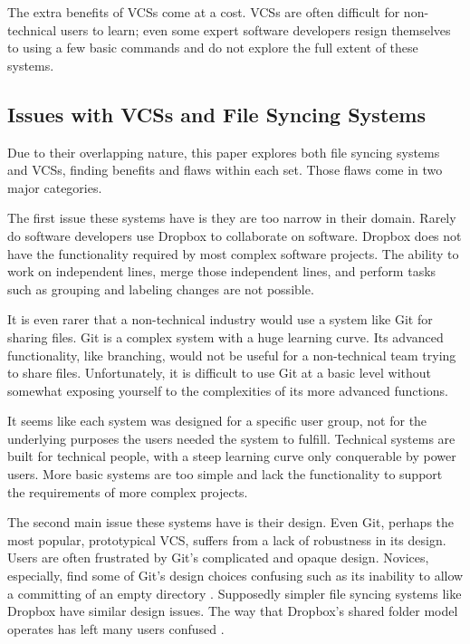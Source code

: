 The extra benefits of VCSs come at a cost. VCSs are often difficult for non-technical users to learn; even some expert software developers resign themselves to using a few basic commands and do not explore the full extent of these systems. 

\subsection{Issues with VCSs and File Syncing Systems}

Due to their overlapping nature, this paper explores both file syncing systems and VCSs, finding benefits and flaws within each set. Those flaws come in two major categories.

The first issue these systems have is they are too narrow in their domain. Rarely do software developers use Dropbox to collaborate on software. Dropbox does not have the functionality required by most complex software projects. The ability to work on independent lines, merge those independent lines, and perform tasks such as grouping and labeling changes are not possible.

It is even rarer that a non-technical industry would use a system like Git for sharing files. Git is a complex system with a huge learning curve. Its advanced functionality, like branching, would not be useful for a non-technical team trying to share files. Unfortunately, it is difficult to use Git at a basic level without somewhat exposing yourself to the complexities of its more advanced functions.

It seems like each system was designed for a specific user group, not for the underlying purposes the users needed the system to fulfill. Technical systems are built for technical people, with a steep learning curve only conquerable by power users. More basic systems are too simple and lack the functionality to support the requirements of more complex projects.

The second main issue these systems have is their design. Even Git, perhaps the most popular, prototypical VCS, suffers from a lack of robustness in its design. Users are often frustrated by Git's complicated and opaque design. Novices, especially, find some of Git's design choices confusing such as its inability to allow a committing of an empty directory \cite{RossoJackson}. Supposedly simpler file syncing systems like Dropbox have similar design issues. The way that Dropbox's shared folder model operates has left many users confused \cite{Zhang}.

